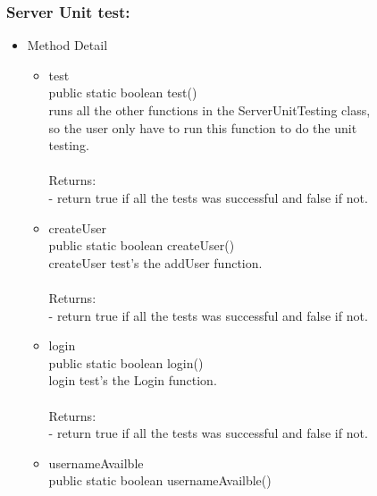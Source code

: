 \documentclass[letterpaper]{article}
\begin{document}
								\subsubsection*{Server Unit test:}
								\vspace{0.1in}	
									\begin{itemize}
										\item	Method Detail
												\begin{itemize}
													\item	test \\
															 public static boolean test() \\
				
															runs all the other functions in the ServerUnitTesting class,\\											so the user only have to run this function to do the unit \\ testing. \\ \\
															Returns: \\
															- return true if all the tests was successful and false if not.
															
															\item	createUser \\
															 public static boolean createUser() \\
				
															createUser test's the addUser function. \\ \\
															Returns: \\
															- return true if all the tests was successful and false if not.
															
															\item	login \\
															  public static boolean login() \\
				
															login test's the Login function. \\ \\
															Returns: \\
															- return true if all the tests was successful and false if not.
															
															\item	usernameAvailble \\
															 public static boolean usernameAvailble() \\
				

\end{itemize}
\end{itemize}
\end{document}
